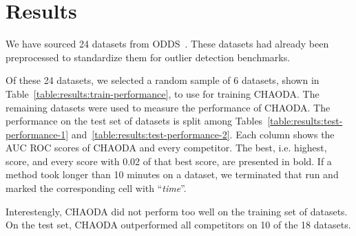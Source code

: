 \section{Results}
\label{sec:results}

We have sourced 24 datasets from ODDS~\cite{rayana2016odds}.
These datasets had already been preprocessed to standardize them for outlier detection benchmarks.

Of these 24 datasets, we selected a random sample of 6 datasets, shown in Table~\ref{table:results:train-performance}, to use for training CHAODA.
The remaining datasets were used to measure the performance of CHAODA.
The performance on the test set of datasets is split among Tables~\ref{table:results:test-performance-1} and~\ref{table:results:test-performance-2}.
Each column shows the AUC ROC scores of CHAODA and every competitor.
The best, i.e. highest, score, and every score with 0.02 of that best score, are presented in bold.
If a method took longer than 10 minutes on a dataset, we terminated that run and marked the corresponding cell with ``\textit{time}''.

Interestengly, CHAODA did not perform too well on the training set of datasets.
On the test set, CHAODA outperformed all competitors on 10 of the 18 datasets.


